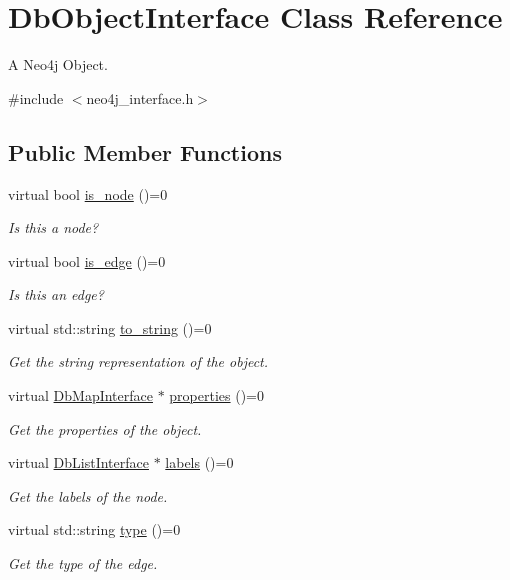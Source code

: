 \hypertarget{classDbObjectInterface}{\section{Db\-Object\-Interface Class Reference}
\label{classDbObjectInterface}
}


A Neo4j Object.  




{\ttfamily \#include $<$neo4j\-\_\-interface.\-h$>$}

\subsection*{Public Member Functions}
\begin{DoxyCompactItemize}
\item 
virtual bool \hyperlink{classDbObjectInterface_a3c1c9af939a1e038a082930e57c2afca}{is\-\_\-node} ()=0
\begin{DoxyCompactList}\small\item\em Is this a node? \end{DoxyCompactList}\item 
virtual bool \hyperlink{classDbObjectInterface_af2ab883d4af94b4e7bd25a117bb1f39b}{is\-\_\-edge} ()=0
\begin{DoxyCompactList}\small\item\em Is this an edge? \end{DoxyCompactList}\item 
\hypertarget{classDbObjectInterface_a93c98f06ce3f5493525dd19b337cebbc}{virtual std\-::string \hyperlink{classDbObjectInterface_a93c98f06ce3f5493525dd19b337cebbc}{to\-\_\-string} ()=0}\label{classDbObjectInterface_a93c98f06ce3f5493525dd19b337cebbc}

\begin{DoxyCompactList}\small\item\em Get the string representation of the object. \end{DoxyCompactList}\item 
virtual \hyperlink{classDbMapInterface}{Db\-Map\-Interface} $\ast$ \hyperlink{classDbObjectInterface_aeede7445ae376fc03af884d5b6f1cb2e}{properties} ()=0
\begin{DoxyCompactList}\small\item\em Get the properties of the object. \end{DoxyCompactList}\item 
virtual \hyperlink{classDbListInterface}{Db\-List\-Interface} $\ast$ \hyperlink{classDbObjectInterface_a281232cca6b9f53f3881100b1a7e5915}{labels} ()=0
\begin{DoxyCompactList}\small\item\em Get the labels of the node. \end{DoxyCompactList}\item 
virtual std\-::string \hyperlink{classDbObjectInterface_a9c2f2de3322439ccdc8e16bd98388040}{type} ()=0
\begin{DoxyCompactList}\small\item\em Get the type of the edge. \end{DoxyCompactList}\end{DoxyCompactItemize}


